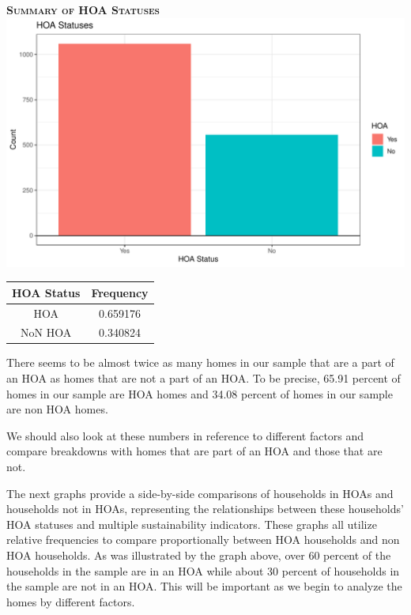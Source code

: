 \documentclass{article}
\begin{document}
\textsc{\textbf{Summary of HOA Statuses}}
\newline
\newline
\includegraphics{exam22-008}
\begin{table}[h]
\begin{tabular}{|c|c|} \hline
HOA Status & Frequency \\ \hline
HOA        & 0.659176  \\ \hline
NoN HOA    & 0.340824 \\ \hline
\end{tabular}
\end{table}

There seems to be almost twice as many homes in our sample that are a part of an HOA as homes that are not a part of an HOA. To be precise, 65.91 percent of homes in our sample are HOA homes and 34.08 percent of homes in our sample are non HOA homes. 


We should also look at these numbers in reference to different factors and compare breakdowns with homes that are part of an HOA and those that are not.


The next graphs provide a side-by-side comparisons of households in HOAs and households not in HOAs, representing the relationships between these households' HOA statuses and multiple sustainability indicators. These graphs all utilize relative frequencies to compare proportionally between HOA households and non HOA households. As was illustrated by the graph above, over 60 percent of the households in the sample are in an HOA while about 30 percent of households in the sample are not in an HOA. This will be important as we begin to analyze the homes by different factors. 
\end{document}
